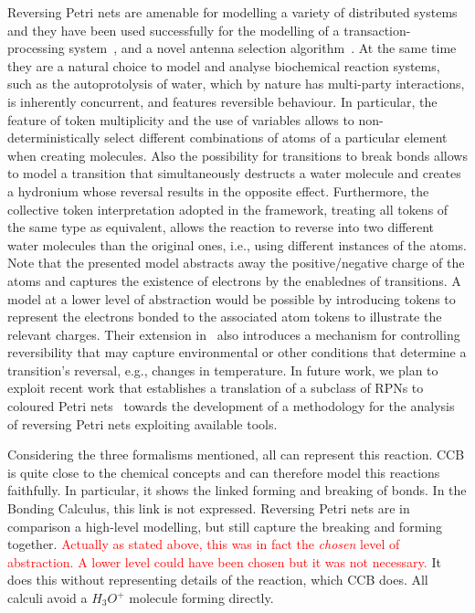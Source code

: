 \documentclass[runningheads]{llncs}
\newcommand\anna[1]{\textcolor{red}{#1}}
\begin{document}
Reversing Petri nets are amenable for modelling
a variety of distributed systems and they have been used successfully for
the modelling of a transaction-processing system~\cite{RPNs}, and a novel antenna selection  algorithm~\cite{RC19}. At the same time they are a natural choice to model and analyse biochemical reaction systems, such as the autoprotolysis of water, which by nature
has multi-party interactions, is inherently concurrent, and features reversible behaviour. 
In particular, the feature of token multiplicity and
the use of variables allows to non-deterministically
select different combinations of atoms of a particular element when creating molecules. Also the possibility for
transitions to break bonds allows to model a transition that simultaneously
destructs  a water molecule and creates a hydronium whose  reversal results in the opposite effect. Furthermore,
the collective token interpretation adopted in the framework, treating all tokens of the same type
as equivalent, allows the reaction to reverse into two different water molecules than the original ones,
i.e., using different instances of the atoms.
Note that the presented model abstracts away the positive/negative charge of the atoms and
captures the existence of electrons by the enablednes of transitions. A model at a lower
level of abstraction would be possible by introducing tokens to represent the electrons  bonded to the associated
atom tokens to illustrate the relevant charges.
Their extension in~\cite{RC19} also introduces
a mechanism for controlling reversibility%
 that may capture environmental or other conditions that determine a transition's
reversal, e.g., changes in temperature. In future work, we plan to exploit recent work that establishes a translation of a subclass of RPNs to coloured Petri nets~\cite{RPNtoCPN} towards the development of a methodology for the analysis of reversing Petri nets exploiting available tools.

Considering the three formalisms mentioned, all can represent this reaction. CCB is quite close to the chemical concepts and can therefore model this reactions faithfully. In particular, it shows the linked forming and breaking of bonds. In the Bonding Calculus, this link is not expressed. Reversing Petri nets are in comparison a high-level modelling, but still capture the breaking and forming together. \anna{Actually as stated above, this was in fact the \emph{chosen} level of abstraction. A lower level could have been chosen but it was not necessary.} It does this without representing details of the reaction, which CCB does. All calculi avoid a $H_3O^+$ molecule forming directly.
\end{document}
